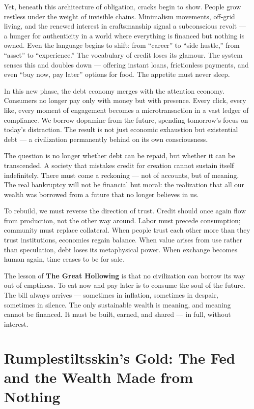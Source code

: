 \documentclass[11pt,twoside]{book}
\begin{document}
Yet, beneath this architecture of obligation, cracks begin to show.  
People grow restless under the weight of invisible chains.  
Minimalism movements, off-grid living, and the renewed interest in craftsmanship signal a subconscious revolt --- a hunger for authenticity in a world where everything is financed but nothing is owned.  
Even the language begins to shift: from “career” to “side hustle,” from “asset” to “experience.”  
The vocabulary of credit loses its glamour.  
The system senses this and doubles down --- offering instant loans, frictionless payments, and even “buy now, pay later” options for food.  
The appetite must never sleep.

In this new phase, the debt economy merges with the attention economy.  
Consumers no longer pay only with money but with presence.  
Every click, every like, every moment of engagement becomes a microtransaction in a vast ledger of compliance.  
We borrow dopamine from the future, spending tomorrow’s focus on today’s distraction.  
The result is not just economic exhaustion but existential debt --- a civilization permanently behind on its own consciousness.

The question is no longer whether debt can be repaid, but whether it can be transcended.  
A society that mistakes credit for creation cannot sustain itself indefinitely.  
There must come a reckoning --- not of accounts, but of meaning.  
The real bankruptcy will not be financial but moral: the realization that all our wealth was borrowed from a future that no longer believes in us.

To rebuild, we must reverse the direction of trust.  
Credit should once again flow from production, not the other way around.  
Labor must precede consumption; community must replace collateral.  
When people trust each other more than they trust institutions, economies regain balance.  
When value arises from use rather than speculation, debt loses its metaphysical power.  
When exchange becomes human again, time ceases to be for sale.

The lesson of \textbf{The Great Hollowing} is that no civilization can borrow its way out of emptiness.  
To eat now and pay later is to consume the soul of the future.  
The bill always arrives --- sometimes in inflation, sometimes in despair, sometimes in silence.  
The only sustainable wealth is meaning, and meaning cannot be financed.  
It must be built, earned, and shared --- in full, without interest.

\chapter{Rumplestiltsskin’s Gold: The Fed and the Wealth Made from Nothing}
\label{ch:17}
\end{document}
